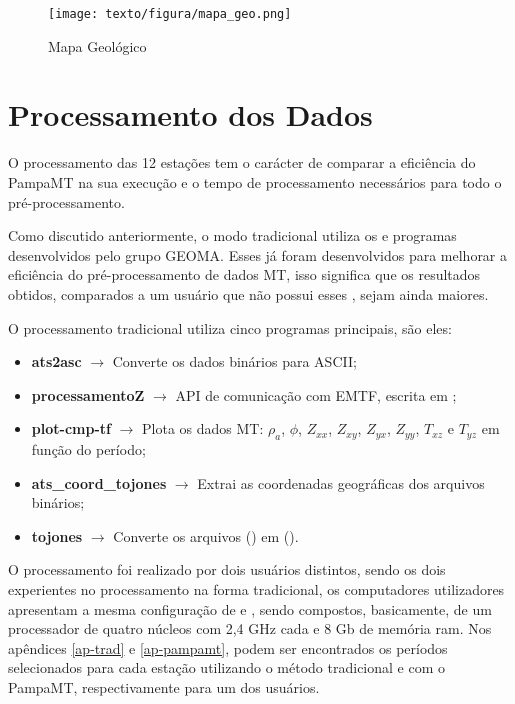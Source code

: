     \begin{figure}[H]
        \caption{Mapa Geológico}
            \begin{center}
                \texttt{[image: texto/figura/mapa\_geo.png]}
            \end{center}
        \label{local-bor}
    \end{figure}
        
    \section{Processamento dos Dados}
    
        O processamento das 12 estações tem o carácter de comparar a eficiência do PampaMT na sua execução e o tempo de processamento necessários para todo o pré-processamento.
        
        Como discutido anteriormente, o modo tradicional utiliza os  e programas desenvolvidos pelo grupo GEOMA. Esses  já foram desenvolvidos para melhorar a eficiência do pré-processamento de dados MT, isso significa que os resultados obtidos, comparados a um usuário que não possui esses , sejam ainda maiores.  
        
        O processamento tradicional utiliza cinco programas principais, são eles:
        
        \begin{itemize}
         \item \textbf{ats2asc} $\rightarrow$ Converte os dados binários para ASCII;
         \item \textbf{processamentoZ} $\rightarrow$ API de comunicação com EMTF, escrita em ;
         \item \textbf{plot-cmp-tf} $\rightarrow$ Plota os dados MT: $\rho_a$, $\phi$, $Z_{xx}$, $Z_{xy}$, $Z_{yx}$, $Z_{yy}$, $T_{xz}$ e $T_{yz}$ em função do período; 
         \item \textbf{ats\_coord\_tojones} $\rightarrow$ Extrai as coordenadas geográficas dos arquivos binários;
         \item \textbf{tojones} $\rightarrow$ Converte os arquivos  () em  ().
        \end{itemize}

        O processamento foi realizado por dois usuários distintos, sendo os dois experientes no processamento na forma tradicional, os computadores utilizadores apresentam a mesma configuração de  e , sendo compostos, basicamente, de um processador de quatro núcleos com 2,4 GHz cada e 8 Gb de memória ram. Nos apêndices \ref{ap-trad} e \ref{ap-pampamt}, podem ser encontrados os períodos selecionados para cada estação utilizando o método tradicional e com o PampaMT, respectivamente para um dos usuários.
        
